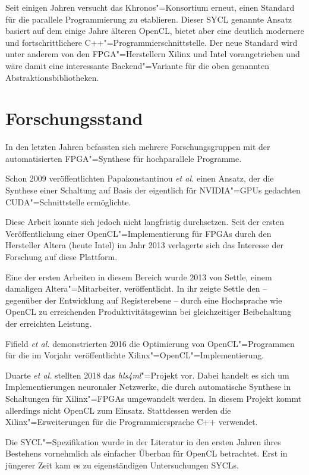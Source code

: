 Seit einigen Jahren versucht das Khronos"=Konsortium erneut, einen Standard für
die parallele Programmierung zu etablieren. Dieser SYCL genannte Ansatz basiert
auf dem einige Jahre älteren OpenCL, bietet aber eine deutlich modernere und
fortschrittlichere C++"=Programmierschnittstelle. Der neue Standard wird unter
anderem von den FPGA"=Herstellern Xilinx und Intel vorangetrieben und wäre damit
eine interessante Backend"=Variante für die oben genannten
Abstraktionsbibliotheken.

\section{Forschungsstand}\label{einleitung:forschung}

In den letzten Jahren befassten sich mehrere Forschungsgruppen mit der
automatisierten \mbox{FPGA}"=Synthese für hochparallele Programme.

Schon 2009 veröffentlichten Papakonstantinou \textit{et al.} einen Ansatz, der
die Synthese einer Schaltung auf Basis der eigentlich für NVIDIA"=GPUs gedachten
CUDA"=Schnittstelle ermöglichte. \cite[vgl.][]{papakonstantinou2009} 

Diese Arbeit konnte sich jedoch nicht langfristig durchsetzen. Seit der ersten
Veröffentlichung einer OpenCL"=Implementierung für FPGAs durch den Hersteller
Altera (heute Intel) im Jahr 2013 verlagerte sich das Interesse der Forschung
auf diese Plattform. 

Eine der ersten Arbeiten in diesem Bereich wurde 2013 von Settle, einem
damaligen Altera"=Mitarbeiter, veröffentlicht. In ihr zeigte Settle den
-- gegenüber der Entwicklung auf Registerebene -- durch eine Hochsprache wie
OpenCL zu erreichenden Produktivitätsgewinn bei gleichzeitiger Beibehaltung der
erreichten Leistung. \cite[vgl.][]{settle2013}

Fifield \textit{et al.} demonstrierten 2016 die Optimierung von
OpenCL"=Programmen für die im Vorjahr veröffentlichte
Xilinx"=OpenCL"=Implementierung. \cite[vgl.][]{fifield2016}

Duarte \textit{et al.} stellten 2018 das \textit{hls4ml}"=Projekt vor. Dabei
handelt es sich um Implementierungen neuronaler Netzwerke, die durch
automatische Synthese in Schaltungen für Xilinx"=FPGAs umgewandelt werden. In
diesem Projekt kommt allerdings nicht OpenCL zum Einsatz. Stattdessen werden
die Xilinx"=Erweiterungen für die Programmiersprache C++ verwendet.
\cite[vgl.][]{duarte2018}

Die SYCL"=Spezifikation wurde in der Literatur in den ersten Jahren ihres
Bestehens vornehmlich als einfacher Überbau für OpenCL betrachtet. Erst in
jüngerer Zeit kam es zu eigenständigen Untersuchungen SYCLs.

